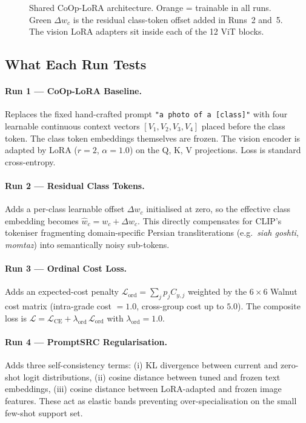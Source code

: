 \documentclass[letterpaper,11pt,leqno]{article}
\begin{document}
\begin{figure}[H]
\begin{tikzpicture}
\end{tikzpicture}
\caption{Shared CoOp-LoRA architecture.  Orange = trainable in all runs.
Green $\Delta w_c$ is the residual class-token offset added in Runs~2 and~5.
The vision LoRA adapters sit inside each of the 12 ViT blocks.}
\label{fig:coop_lora_arch}
\end{figure}

\subsection{What Each Run Tests}

\paragraph{Run 1 --- CoOp-LoRA Baseline.}
Replaces the fixed hand-crafted prompt \texttt{"a photo of a [class]"} with
four learnable continuous context vectors $[V_1, V_2, V_3, V_4]$ placed before
the class token.  The class token embeddings themselves are frozen.  The vision
encoder is adapted by LoRA ($r{=}2$, $\alpha{=}1.0$) on the Q, K, V projections.
Loss is standard cross-entropy.

\paragraph{Run 2 --- Residual Class Tokens.}
Adds a per-class learnable offset $\Delta w_c$ initialised at zero, so the
effective class embedding becomes $\hat{w}_c = w_c + \Delta w_c$.  This directly
compensates for CLIP's tokeniser fragmenting domain-specific Persian
transliterations (e.g.\ \textit{siah goshti}, \textit{momtaz}) into
semantically noisy sub-tokens.

\paragraph{Run 3 --- Ordinal Cost Loss.}
Adds an expected-cost penalty $\mathcal{L}_\mathrm{ord} = \sum_j p_j C_{y,j}$
weighted by the $6\times6$ Walnut cost matrix (intra-grade cost $=1.0$,
cross-group cost up to $5.0$).  The composite loss is
$\mathcal{L} = \mathcal{L}_\mathrm{CE} + \lambda_\mathrm{ord}\,\mathcal{L}_\mathrm{ord}$
with $\lambda_\mathrm{ord}{=}1.0$.

\paragraph{Run 4 --- PromptSRC Regularisation.}
Adds three self-consistency terms: (i) KL divergence between current and
zero-shot logit distributions, (ii) cosine distance between tuned and frozen
text embeddings, (iii) cosine distance between LoRA-adapted and frozen image
features.  These act as elastic bands preventing over-specialisation on the
small few-shot support set.
\end{document}
